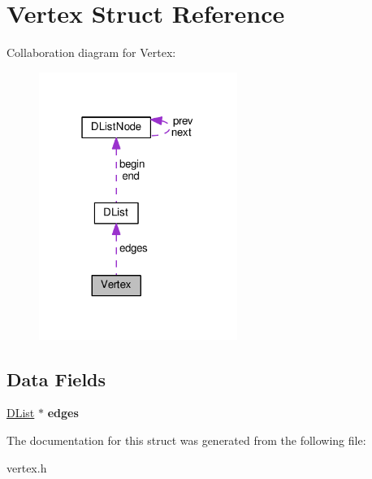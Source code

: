 \hypertarget{structVertex}{}\section{Vertex Struct Reference}
\label{structVertex}


Collaboration diagram for Vertex\+:\nopagebreak
\begin{figure}[H]
\begin{center}
\leavevmode
\includegraphics[width=183pt]{structVertex__coll__graph}
\end{center}
\end{figure}
\subsection*{Data Fields}
\begin{DoxyCompactItemize}
\item 
\hyperlink{structDList}{D\+List} $\ast$ {\bfseries edges}\hypertarget{structVertex_a1d47f7cbd5679ba2c22c556b39f994a8}{}\label{structVertex_a1d47f7cbd5679ba2c22c556b39f994a8}

\end{DoxyCompactItemize}


The documentation for this struct was generated from the following file\+:\begin{DoxyCompactItemize}
\item 
vertex.\+h\end{DoxyCompactItemize}
